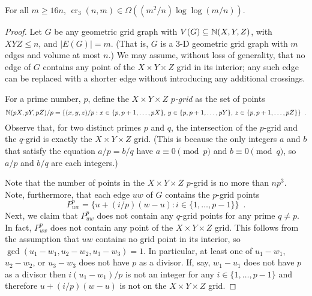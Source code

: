 \documentclass{patmorin}
\DeclareMathOperator{\crs}{cr}
\begin{document}
\begin{thm}
  For all $m\ge 16n$, $\crs_3(n,m) \in \Omega((m^2/n)\log\log (m/n))$.
\end{thm}

\begin{proof}
  Let $G$ be any geometric grid graph with $V(G)\subseteq\mathbb{N}(X,Y,Z)$, with
  $XYZ\le n$, and $|E(G)|=m$. (That is, $G$ is a 3-D geometric grid graph
  with $m$ edges and volume at most $n$.)  We may assume, without loss
  of generality, that no edge of $G$ contains any point of the $X\times
  Y\times Z$ grid in its interior; any such edge can be replaced with
  a shorter edge without introducing any additional crossings.

  For a prime number, $p$, define the $X\times Y\times Z$ \emph{$p$-grid}
  as the set of points
  \[
    \mathbb{N}(pX,pY,pZ)/p = \{(x,y,z)/p: x\in\{p,p+1,\ldots,pX\},\,
    y\in\{p,p+1,\ldots,pY\},\, z\in\{p,p+1,\ldots,pZ\}\} \enspace .
  \]
  Observe that, for two distinct primes $p$ and $q$, the intersection
  of the $p$-grid and the $q$-grid is exactly the $X\times Y\times Z$
  grid. (This is because the only integers $a$ and $b$ that satisfy the
  equation $a/p = b/q$ have $a\equiv 0 \pmod{p}$ and $b\equiv 0\pmod q$,
  so $a/p$ and $b/q$ are each integers.)

  Note that the number of points in the $X\times Y\times Z$ $p$-grid is
  no more than $np^3$.  Note, furthermore, that each edge $uw$ of $G$
  contains the $p$-grid points
  \[
      P_{uw}^p = \{ u+(i/p)(w-u) : i\in\{1,\ldots,p-1\} \} \enspace .
  \]
  Next, we claim that $P_{uw}^p$ does not contain any $q$-grid points for
  any prime $q\neq p$.  In fact, $P_{uw}^p$ does not contain any point
  of the $X\times Y\times Z$ grid.  This follows from the assumption that
  $uw$ contains no grid point in its interior, so $\gcd(u_1-w_1, u_2-w_2,
  u_3-w_3)=1$.  In particular, at least one of $u_1-w_1$, $u_2-w_2$,
  or $u_3-w_3$ does not have $p$ as a divisor.  If, say, $w_1-u_1$ does
  not have $p$ as a divisor then $i(u_1-w_1)/p$ is not an integer for
  any $i\in\{1,\ldots,p-1\}$ and therefore $u+(i/p)(w-u)$ is not on the
  $X\times Y\times Z$ grid.


\end{proof}
\end{document}
